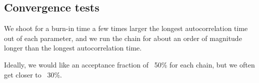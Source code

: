 \documentclass{article}
\begin{document}
\subsection{Convergence tests}
We shoot for a burn-in time a few times larger the longest
autocorrelation time out of each parameter, and we run the chain for
about an order of magnitude longer than the longest autocorrelation
time.

Ideally, we would like an acceptance fraction of ~50\% for each chain, but 
we often get closer to ~30\%.
\end{document}
